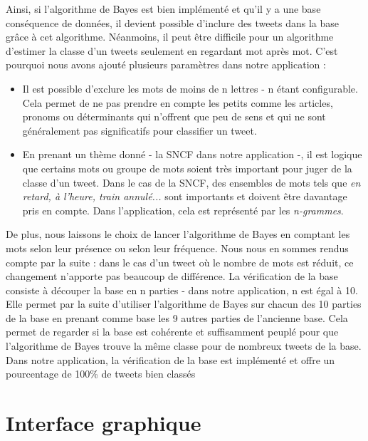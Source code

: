 \documentclass[a4paper,10pt]{report}
\begin{document}
      Ainsi, si l'algorithme de Bayes est bien implémenté et qu'il y a une base conséquence de données, il devient possible d'inclure des tweets dans la base grâce à cet algorithme.
      Néanmoins, il peut être difficile pour un algorithme d'estimer la classe d'un tweets seulement en regardant mot après mot. C'est pourquoi nous avons ajouté plusieurs paramètres dans notre application :
      \begin{itemize}
	    \item Il est possible d'exclure les mots de moins de n lettres - n étant configurable. Cela permet de ne pas prendre en compte les petits comme les articles, pronoms ou déterminants qui n'offrent que peu de sens et qui ne sont généralement pas significatifs pour classifier un tweet. 
	    \item En prenant un thème donné - la SNCF dans notre application -, il est logique que certains mots ou groupe de mots soient très important pour juger de la classe d'un tweet. Dans le cas de la SNCF, des ensembles de mots tels que \textit{en retard, à l'heure, train annulé...} sont importants et doivent être davantage pris en compte. Dans l'application, cela est représenté par les \textit{n-grammes}.
      \end{itemize}
      De plus, nous laissons le choix de lancer l'algorithme de Bayes en comptant les mots selon leur présence ou selon leur fréquence.
      Nous nous en sommes rendus compte par la suite : dans le cas d'un tweet où le nombre de mots est réduit, ce changement n'apporte pas beaucoup de différence.
      \newline
      \newline
      La vérification de la base consiste à découper la base en n parties - dans notre application, n est égal à 10.
      Elle permet par la suite d'utiliser l'algorithme de Bayes sur chacun des 10 parties de la base en prenant comme base les 9 autres parties de l'ancienne base.
      Cela permet de regarder si la base est cohérente et suffisamment peuplé pour que l'algorithme de Bayes trouve la même classe pour de nombreux tweets de la base.
      Dans notre application, la vérification de la base est implémenté et offre un pourcentage de 100\% de tweets bien classés
      
  \section{Interface graphique}
\end{document}
